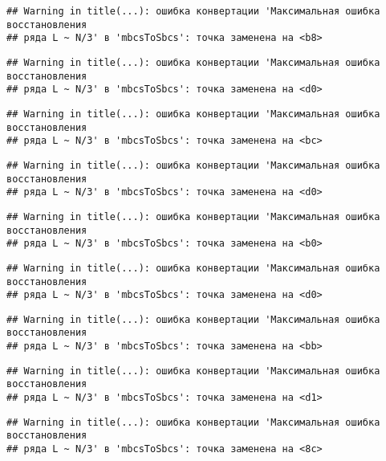 \documentclass[
]{article}
\begin{document}
\begin{verbatim}
## Warning in title(...): ошибка конвертации 'Максимальная ошибка восстановления
## ряда L ~ N/3' в 'mbcsToSbcs': точка заменена на <b8>
\end{verbatim}

\begin{verbatim}
## Warning in title(...): ошибка конвертации 'Максимальная ошибка восстановления
## ряда L ~ N/3' в 'mbcsToSbcs': точка заменена на <d0>
\end{verbatim}

\begin{verbatim}
## Warning in title(...): ошибка конвертации 'Максимальная ошибка восстановления
## ряда L ~ N/3' в 'mbcsToSbcs': точка заменена на <bc>
\end{verbatim}

\begin{verbatim}
## Warning in title(...): ошибка конвертации 'Максимальная ошибка восстановления
## ряда L ~ N/3' в 'mbcsToSbcs': точка заменена на <d0>
\end{verbatim}

\begin{verbatim}
## Warning in title(...): ошибка конвертации 'Максимальная ошибка восстановления
## ряда L ~ N/3' в 'mbcsToSbcs': точка заменена на <b0>
\end{verbatim}

\begin{verbatim}
## Warning in title(...): ошибка конвертации 'Максимальная ошибка восстановления
## ряда L ~ N/3' в 'mbcsToSbcs': точка заменена на <d0>
\end{verbatim}

\begin{verbatim}
## Warning in title(...): ошибка конвертации 'Максимальная ошибка восстановления
## ряда L ~ N/3' в 'mbcsToSbcs': точка заменена на <bb>
\end{verbatim}

\begin{verbatim}
## Warning in title(...): ошибка конвертации 'Максимальная ошибка восстановления
## ряда L ~ N/3' в 'mbcsToSbcs': точка заменена на <d1>
\end{verbatim}

\begin{verbatim}
## Warning in title(...): ошибка конвертации 'Максимальная ошибка восстановления
## ряда L ~ N/3' в 'mbcsToSbcs': точка заменена на <8c>
\end{verbatim}
\end{document}
